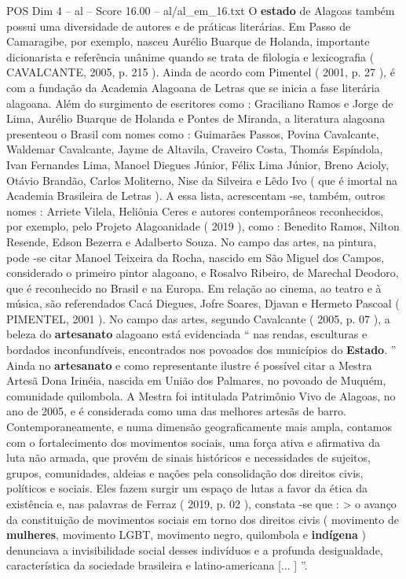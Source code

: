 \begin{textsample}{POS Dim 4 – al – Score 16.00 – al/al\_em\_16.txt}
O \textbf{estado} de Alagoas também possui uma diversidade de autores e de práticas literárias.
Em Passo de Camaragibe, por exemplo, nasceu Aurélio Buarque de Holanda, importante dicionarista e referência unânime quando se trata de filologia e lexicografia ( CAVALCANTE, 2005, p. 215 ).
Ainda de acordo com Pimentel ( 2001, p. 27 ), é com a fundação da Academia Alagoana de Letras que se inicia a fase literária alagoana.
Além do surgimento de escritores como : Graciliano Ramos e Jorge de Lima, Aurélio Buarque de Holanda e Pontes de Miranda, a literatura alagoana presenteou o Brasil com nomes como : Guimarães Passos, Povina Cavalcante, Waldemar Cavalcante, Jayme de Altavila, Craveiro Costa, Thomás Espíndola, Ivan Fernandes Lima, Manoel Diegues Júnior, Félix Lima Júnior, Breno Acioly, Otávio Brandão, Carlos Moliterno, Nise da Silveira e Lêdo Ivo ( que é imortal na Academia Brasileira de Letras ).
A essa lista, acrescentam -se, também, outros nomes : Arriete Vilela, Heliônia Ceres e autores contemporâneos reconhecidos, por exemplo, pelo Projeto Alagoanidade ( 2019 ), como : Benedito Ramos, Nilton Resende, Edson Bezerra e Adalberto Souza.
No campo das artes, na pintura, pode -se citar Manoel Teixeira da Rocha, nascido em São Miguel dos Campos, considerado o primeiro pintor alagoano, e Rosalvo Ribeiro, de Marechal Deodoro, que é reconhecido no Brasil e na Europa.
Em relação ao cinema, ao teatro e à música, são referendados Cacá Diegues, Jofre Soares, Djavan e Hermeto Pascoal ( PIMENTEL, 2001 ).
No campo das artes, segundo Cavalcante ( 2005, p. 07 ), a beleza do \textbf{artesanato} alagoano está evidenciada “ nas rendas, esculturas e bordados inconfundíveis, encontrados nos povoados dos municípios do \textbf{Estado}. ” Ainda no \textbf{artesanato} e como representante ilustre é possível citar a Mestra Artesã Dona Irinéia, nascida em União dos Palmares, no povoado de Muquém, comunidade quilombola.
A Mestra foi intitulada Patrimônio Vivo de Alagoas, no ano de 2005, e é considerada como uma das melhores artesãs de barro.
Contemporaneamente, e numa dimensão geograficamente mais ampla, contamos com o fortalecimento dos movimentos sociais, uma força ativa e afirmativa da luta não armada, que provém de sinais históricos e necessidades de sujeitos, grupos, comunidades, aldeias e nações pela consolidação dos direitos civis, políticos e sociais.
Eles fazem surgir um espaço de lutas a favor da ética da existência e, nas palavras de Ferraz ( 2019, p. 02 ), constata -se que : > o avanço da constituição de movimentos sociais em torno dos direitos civis ( movimento de \textbf{mulheres}, movimento LGBT, movimento negro, quilombola e \textbf{indígena} ) denunciava a invisibilidade social desses indivíduos e a profunda desigualdade, característica da sociedade brasileira e latino-americana [... ] ”.

\end{textsample}
